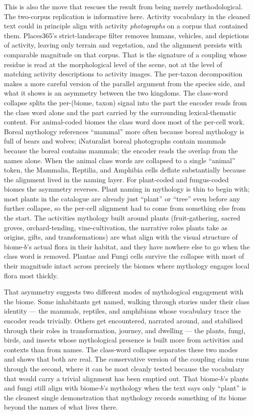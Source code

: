 \documentclass[11pt,a4paper]{article}
\begin{document}
This is also the move that rescues the result from being merely
methodological. The two-corpus replication is informative here.
Activity vocabulary in the cleaned text could in principle align
with activity \emph{photographs} on a corpus that contained them.
Places365's strict-landscape filter removes humans, vehicles,
and depictions of activity, leaving only terrain and vegetation,
and the alignment persists with comparable magnitude on that
corpus. That is the signature of a coupling whose residue is
read at the morphological level of the scene, not at the level of
matching activity descriptions to activity images. The per-taxon decomposition makes a more careful version of the
parallel argument from the species side, and what it shows is an
asymmetry between the two kingdoms. The class-word collapse
splits the per-(biome, taxon) signal into the part the encoder
reads from the class word alone and the part carried by the
surrounding lexical-thematic content. For animal-coded biomes
the class word does most of the per-cell work. Boreal mythology
references ``mammal'' more often because boreal mythology is
full of bears and wolves; iNaturalist boreal photographs contain
mammals because the boreal contains mammals; the encoder reads
the overlap from the names alone. When the animal class words
are collapsed to a single ``animal'' token, the Mammalia,
Reptilia, and Amphibia cells deflate substantially because the
alignment lived in the naming layer. For plant-coded and
fungus-coded biomes the asymmetry reverses. Plant naming in
mythology is thin to begin with; most plants in the catalogue
are already just ``plant'' or ``tree'' even before any further
collapse, so the per-cell alignment had to come from something
else from the start. The activities mythology built around
plants (fruit-gathering, sacred groves, orchard-tending,
vine-cultivation, the narrative roles plants take as origins,
gifts, and transformations) are what align with the visual
structure of biome-$b$'s actual flora in their habitat, and
they have nowhere else to go when the class word is removed.
Plantae and Fungi cells survive the collapse with most of their
magnitude intact across precisely the biomes where mythology
engages local flora most thickly.

That asymmetry suggests two different modes of mythological
engagement with the biome. Some inhabitants get named, walking
through stories under their class identity --- the mammals,
reptiles, and amphibians whose vocabulary trace the encoder
reads trivially. Others get encountered, narrated around, and
stabilised through their roles in transformation, journey, and
dwelling --- the plants, fungi, birds, and insects whose
mythological presence is built more from activities and contexts
than from names. The class-word collapse separates these two
modes and shows that both are real. The conservative version of
the coupling claim runs through the second, where it can be most
cleanly tested because the vocabulary that would carry a trivial
alignment has been emptied out. That biome-$b$'s plants and fungi
still align with biome-$b$'s mythology when the text says only
``plant'' is the cleanest single demonstration that mythology
records something of its biome beyond the names of what lives
there.
\end{document}
